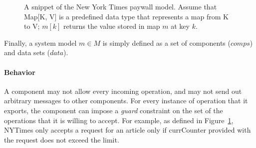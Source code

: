 \begin{figure}[!t]
\caption{A snippet of the New York Times paywall model. Assume that
  \textsf{Map[K, V]} is a predefined data type that represents a map
  from \textsf{K} to \textsf{V}; $m[k]$ returns the value stored in
  map $m$ at key $k$.}
\label{fig-nytimes-spec}
\end{figure}

Finally, a system model $m \in M$ is
simply defined as a set of components ($comps$) and data sets
($data$). 

\paragraph{\textbf{Behavior}} A component may not allow every incoming
operation, and may not send out arbitrary messages to other
components. For every instance of operation that it exports, the
component can impose a \textit{guard} constraint on the set of the
operations that it is willing to accept. For example, as defined in
Figure~\ref{fig-nytimes-spec}, \textsf{NYTimes} only accepts a request
for an article only if \textsf{currCounter} provided with the request
does not exceed the limit.

